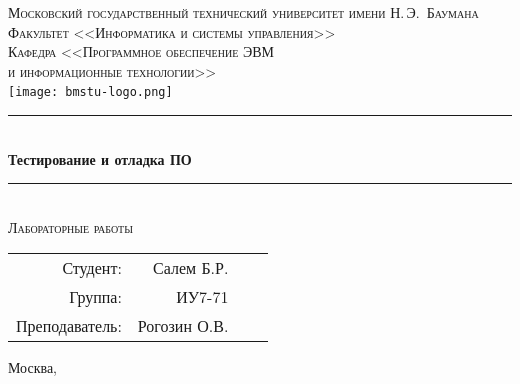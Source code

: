 \newcommand{\HRule}{\rule{\linewidth}{0.5mm}}

\begin{center}

\textsc{\large Московский государственный технический университет имени Н.\,Э.~Баумана}\\[0.5cm]
\textsc{Факультет <<Информатика и системы управления>>}\\
\textsc{Кафедра <<Программное обеспечение ЭВМ\\и информационные технологии>>}\\[0.25cm]

\texttt{[image: bmstu-logo.png]}~\\[2.25cm]

\HRule \\[0.5cm]
{\huge \bfseries Тестирование и отладка ПО}
\HRule \\[0.5cm]

\textsc{\large Лабораторные работы}\\

\vfill

\begin{flushright}
  \begin{tabular}{rrlc}
    Студент: & Салем Б.Р.\\
    Группа: & ИУ7-71\\
    Преподаватель: & Рогозин О.В.\\
  \end{tabular}
\end{flushright}

{\large Москва, \the\year}

\end{center}

\newpage
{}